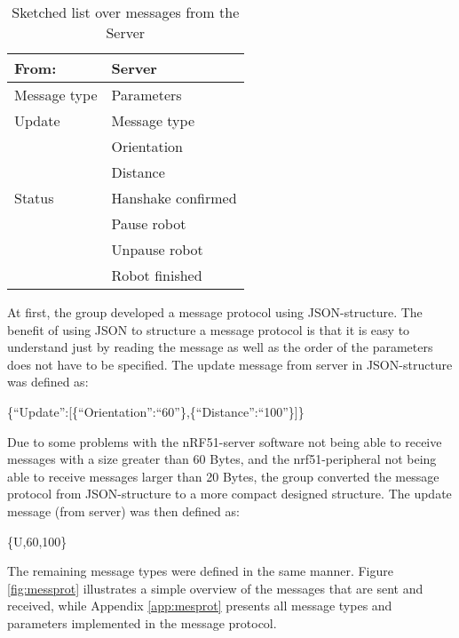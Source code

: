 \begin{table}[ht]
\begin{center}
 \begin{tabular}{|l | l|} 
 \hline
 From: & \textbf{Server}\\
 \hline
 \hline
 Message type       &    Parameters \\
 \hline

 Update              &   Message type \\
                    &   Orientation \\
                    &   Distance \\
 \hline
 Status                &   Hanshake confirmed \\
                    &   Pause robot \\
                    &   Unpause robot \\
                    &   Robot finished \\
 \hline
\end{tabular}
\end{center}
\caption{Sketched list over messages from the Server}
\label{tab:messprotfromser}
\end{table}

At first, the group developed a message protocol using JSON-structure. The benefit of using JSON to structure a message protocol is that it is easy to understand just by reading the message as well as the order of the parameters does not have to be specified. The update message from server in JSON-structure was defined as:

\{``Update'':[\{``Orientation'':``60''\},\{``Distance'':``100''\}]\}

Due to some problems with the nRF51-server software not being able to receive messages with a size greater than 60 Bytes, and the nrf51-peripheral not being able to receive messages larger than 20 Bytes, the group converted the message protocol from JSON-structure to a more compact designed structure. The update message (from server) was then defined as:

\{U,60,100\}

The remaining message types were defined in the same manner. Figure \ref{fig:messprot} illustrates a simple overview of the messages that are sent and received, while Appendix \ref{app:mesprot} presents all message types and parameters implemented in the message protocol.


